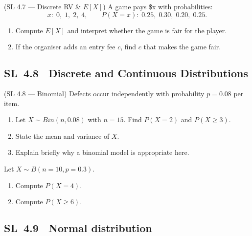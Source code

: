 \documentclass[11pt]{article}
\def\textbf#1{#1}%
\def\mathrm#1{#1}%
\newcommand{\tocsubsection}[1]{\subsection{#1}}
\newcounter{question}
\begin{document}
\begin{question}
\textbf{(SL 4.7 — Discrete RV \& $E[X]$)} A game pays \$x with probabilities:
\[
x:\; 0,\;1,\;2,\;4,\qquad P(X=x):\;0.25,\;0.30,\;0.20,\;0.25.
\]
\begin{enumerate}
  \item Compute $E[X]$ and interpret whether the game is fair for the player.
  \item If the organiser adds an entry fee $c$, find $c$ that makes the game fair.
\end{enumerate}
\end{question}




\tocsubsection{SL 4.8 \; Discrete and Continuous Distributions}
\begin{question}
\textbf{(SL 4.8 — Binomial)} Defects occur independently with probability $p=0.08$ per item.
\begin{enumerate}
  \item Let $X\sim\mathrm{Bin}(n,0.08)$ with $n=15$. Find $P(X=2)$ and $P(X\ge 3)$.
  \item State the mean and variance of $X$.
  \item Explain briefly why a binomial model is appropriate here.
\end{enumerate}
\end{question}

\begin{question}
Let $X\sim\mathrm{B}(n=10,p=0.3)$.
\begin{enumerate}[label=(\roman*)]
\item Compute $P(X=4)$.
\item Compute $P(X\ge 6)$.
\end{enumerate}
\end{question}

\tocsubsection{SL 4.9 \; Normal distribution}


\end{document}
